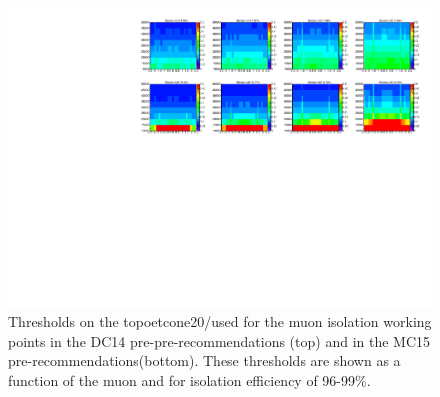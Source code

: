 \begin{figure}[phtb!]
\begin{center}
\includegraphics[width=\textwidth]{FIGURES/ISOLATION/Electron_topoetcone20.pdf}
\end{center}
\vspace{-0.2cm}
\caption{Thresholds on the topoetcone20/\pt used for the muon isolation working points in the DC14 pre-pre-recommendations (top) and in the MC15 pre-recommendations(bottom). These thresholds are shown as a function of the muon \pt and \eta for isolation efficiency of 96-99\%. }
\label{fig:isoThresholdsMuCalo}
\end{figure}
